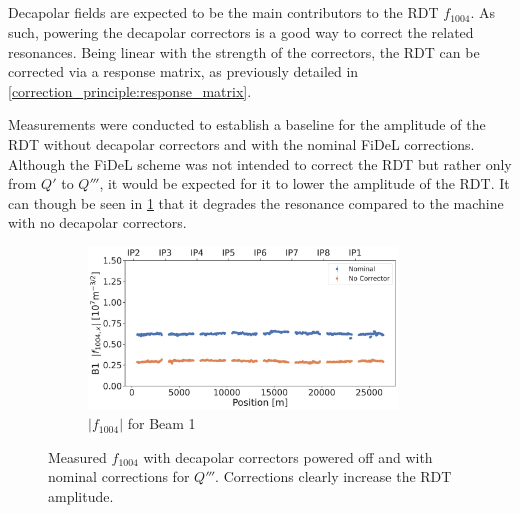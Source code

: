 \subsection{}
\label{section:decapoles:decapolar_contribution_correction}

Decapolar fields are expected to be the main contributors to the RDT $f_{1004}$. As such, powering
the decapolar correctors is a good way to correct the related resonances.
Being linear with the strength of the correctors, the RDT can be corrected via a response matrix,
as previously detailed in \cref{correction_principle:response_matrix}.

Measurements were conducted to establish a baseline for the amplitude of the RDT without decapolar
correctors and with the nominal FiDeL corrections.
Although the FiDeL scheme was not intended to correct the RDT but rather only from $Q'$ to $Q'''$,
it would be expected for it to lower the amplitude of the RDT. It can though be seen in 
\cref{fig:decapoles:rdts:f1004_correction_B1_fidel_vs_bare} that it degrades the resonance compared
to the machine with no decapolar correctors. 

\begin{figure}[!htb]
    \centering
    \begin{subfigure}{1\textwidth}
        \includegraphics[width=0.9\textwidth]{./images/f1004/f1004x_corrections_B1_fidel_vs_bare.pdf}
        \caption{$|f_{1004}|$ for Beam 1}
        \vspace{0.5cm}
    \end{subfigure}
    \caption{Measured $f_{1004}$ with decapolar correctors powered off and with nominal corrections 
    for $Q'''$. Corrections clearly increase the RDT amplitude.}
    \label{fig:decapoles:rdts:f1004_correction_B1_fidel_vs_bare}
\end{figure}

